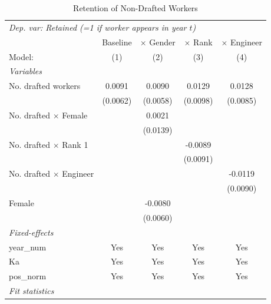 \begin{table}[htbp]
\centering
\caption{Retention of Non-Drafted Workers}
\label{tab:retention}
\begin{threeparttable}
\begin{tabular}{lcccc}
   \tabularnewline \midrule \midrule
\multicolumn{5}{l}{\textit{Dep. var: Retained (=1 if worker appears in year $t$)}} \\
                                  & Baseline & $\times$ Gender  & $\times$ Rank  & $\times$ Engineer \\    
   Model:                         & (1)      & (2)              & (3)            & (4)\\  
   \midrule
   \emph{Variables}\\
   No. drafted workers            & 0.0091   & 0.0090           & 0.0129         & 0.0128\\   
                                  & (0.0062) & (0.0058)         & (0.0098)       & (0.0085)\\   
   No. drafted $\times$ Female    &          & 0.0021           &                &   \\   
                                  &          & (0.0139)         &                &   \\   
   No. drafted $\times$ Rank 1    &          &                  & -0.0089        &   \\   
                                  &          &                  & (0.0091)       &   \\   
   No. drafted $\times$ Engineer  &          &                  &                & -0.0119\\   
                                  &          &                  &                & (0.0090)\\   
   Female                         &          & -0.0080          &                &   \\   
                                  &          & (0.0060)         &                &   \\   
   \midrule
   \emph{Fixed-effects}\\
   year\_num                      & Yes      & Yes              & Yes            & Yes\\  
   Ka                             & Yes      & Yes              & Yes            & Yes\\  
   pos\_norm                      & Yes      & Yes              & Yes            & Yes\\  
   \midrule
   \emph{Fit statistics}\\

\end{tabular}
\end{threeparttable}
\end{table}
